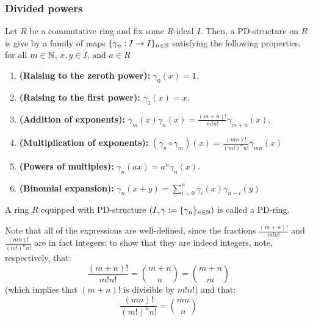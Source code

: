             \subsubsection{Divided powers}
                \begin{definition}
                    Let $R$ be a commutative ring and fix some $R$-ideal $I$. Then, a PD-structure on $R$ is give by a family of maps $\{\gamma_n: I \to I\}_{n \in \mathbb{N}}$ satisfying the following properties, for all $m \in \mathbb{N}$, $x, y \in I$, and $a \in R$
                        \begin{enumerate}
                            \item \textbf{(Raising to the zeroth power):} $\gamma_0(x) = 1$.
                            \item \textbf{(Raising to the first power):} $\gamma_1(x) = x$.
                            \item \textbf{(Addition of exponents):} $\gamma_m(x)\gamma_n(x) = \frac{(m + n)!}{m!n!} \gamma_{m + n}(x)$.
                            \item \textbf{(Multiplication of exponents):} $(\gamma_n \circ \gamma_m)(x) = \frac{(mn)!}{(m!)^n n!} \gamma_{mn}(x)$
                            \item \textbf{(Powers of multiples):} $\gamma_n(ax) = a^n\gamma_n(x)$.
                            \item \textbf{(Binomial expansion):} $\gamma_n(x + y) = \sum_{i=0}^n \gamma_i(x)\gamma_{n - i}(y)$
                        \end{enumerate}
                    A ring $R$ equipped with PD-structure $\left(I, \gamma := \{\gamma_n\}_{n \in \mathbb{N}}\right)$ is called a PD-ring. 
                \end{definition}
                \begin{remark}
                    Note that all of the expressions are well-defined, since the fractions $\frac{(m + n)!}{m!n!}$ and $\frac{(mn)!}{(m!)^n n!}$ are in fact integers: to show that they are indeed integers, note, respectively, that:
                        $$\frac{(m + n)!}{m!n!} = \binom{m + n}{n} = \binom{m + n}{m}$$
                    (which implies that $(m + n)!$ is divisible by $m!n!$) and that:
                        $$\frac{(mn)!}{(m!)^n n!} = \binom{mn}{n}$$
                \end{remark}
                
